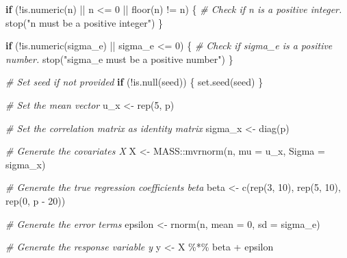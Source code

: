 \documentclass[
  11pt,
]{article}
\newenvironment{Shaded}{}{}
\newcommand{\AttributeTok}[1]{\textcolor[rgb]{0.49,0.56,0.16}{#1}}
\newcommand{\CommentTok}[1]{\textcolor[rgb]{0.38,0.63,0.69}{\textit{#1}}}
\newcommand{\ControlFlowTok}[1]{\textcolor[rgb]{0.00,0.44,0.13}{\textbf{#1}}}
\newcommand{\DecValTok}[1]{\textcolor[rgb]{0.25,0.63,0.44}{#1}}
\newcommand{\FunctionTok}[1]{\textcolor[rgb]{0.02,0.16,0.49}{#1}}
\newcommand{\NormalTok}[1]{#1}
\newcommand{\OtherTok}[1]{\textcolor[rgb]{0.00,0.44,0.13}{#1}}
\newcommand{\SpecialCharTok}[1]{\textcolor[rgb]{0.25,0.44,0.63}{#1}}
\newcommand{\StringTok}[1]{\textcolor[rgb]{0.25,0.44,0.63}{#1}}
\begin{document}
\begin{Shaded}
\begin{Highlighting}[]
  \ControlFlowTok{if}\NormalTok{ (}\SpecialCharTok{!}\FunctionTok{is.numeric}\NormalTok{(n) }\SpecialCharTok{||}\NormalTok{ n }\SpecialCharTok{\textless{}=} \DecValTok{0} \SpecialCharTok{||} \FunctionTok{floor}\NormalTok{(n) }\SpecialCharTok{!=}\NormalTok{ n) \{}
    \CommentTok{\# Check if n is a positive integer.}
    \FunctionTok{stop}\NormalTok{(}\StringTok{"n must be a positive integer"}\NormalTok{)}
\NormalTok{  \}}
  
  \ControlFlowTok{if}\NormalTok{ (}\SpecialCharTok{!}\FunctionTok{is.numeric}\NormalTok{(sigma\_e) }\SpecialCharTok{||}\NormalTok{ sigma\_e }\SpecialCharTok{\textless{}=} \DecValTok{0}\NormalTok{) \{}
    \CommentTok{\# Check if sigma\_e is a positive number.}
    \FunctionTok{stop}\NormalTok{(}\StringTok{"sigma\_e must be a positive number"}\NormalTok{)}
\NormalTok{  \}}
  
  \CommentTok{\# Set seed if not provided}
  \ControlFlowTok{if}\NormalTok{ (}\SpecialCharTok{!}\FunctionTok{is.null}\NormalTok{(seed)) \{}
    \FunctionTok{set.seed}\NormalTok{(seed)}
\NormalTok{  \}}
  
  \CommentTok{\# Set the mean vector}
\NormalTok{  u\_x }\OtherTok{\textless{}{-}} \FunctionTok{rep}\NormalTok{(}\DecValTok{5}\NormalTok{, p)}
  
  \CommentTok{\# Set the correlation matrix as identity matrix}
\NormalTok{  sigma\_x }\OtherTok{\textless{}{-}} \FunctionTok{diag}\NormalTok{(p)}
  
  \CommentTok{\# Generate the covariates X}
\NormalTok{  X }\OtherTok{\textless{}{-}}\NormalTok{ MASS}\SpecialCharTok{::}\FunctionTok{mvrnorm}\NormalTok{(n, }\AttributeTok{mu =}\NormalTok{ u\_x, }\AttributeTok{Sigma =}\NormalTok{ sigma\_x)}
  
  \CommentTok{\# Generate the true regression coefficients beta}
\NormalTok{  beta }\OtherTok{\textless{}{-}} \FunctionTok{c}\NormalTok{(}\FunctionTok{rep}\NormalTok{(}\DecValTok{3}\NormalTok{, }\DecValTok{10}\NormalTok{), }\FunctionTok{rep}\NormalTok{(}\DecValTok{5}\NormalTok{, }\DecValTok{10}\NormalTok{), }\FunctionTok{rep}\NormalTok{(}\DecValTok{0}\NormalTok{, p }\SpecialCharTok{{-}} \DecValTok{20}\NormalTok{))}
  
  \CommentTok{\# Generate the error terms}
\NormalTok{  epsilon }\OtherTok{\textless{}{-}} \FunctionTok{rnorm}\NormalTok{(n, }\AttributeTok{mean =} \DecValTok{0}\NormalTok{, }\AttributeTok{sd =}\NormalTok{ sigma\_e)}
  
  \CommentTok{\# Generate the response variable y}
\NormalTok{  y }\OtherTok{\textless{}{-}}\NormalTok{ X }\SpecialCharTok{\%*\%}\NormalTok{ beta }\SpecialCharTok{+}\NormalTok{ epsilon}
  

\end{Highlighting}
\end{Shaded}
\end{document}
